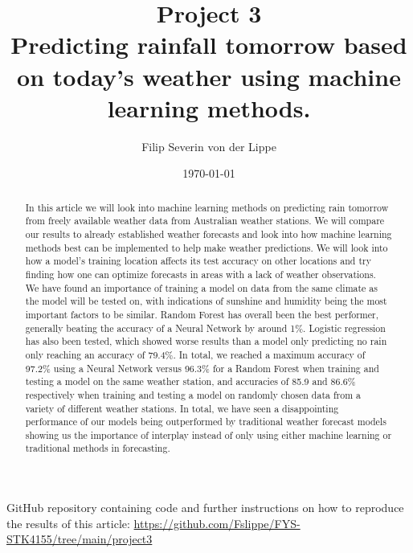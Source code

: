 \documentclass[11pt]{article}
\title{Project 3\\
Predicting rainfall tomorrow based on today's weather using machine learning methods.}
\author{Filip Severin von der Lippe}
\date{\today}
\begin{document}
\maketitle
GitHub repository containing code and further instructions on how to reproduce the results of this article: \url{https://github.com/Fslippe/FYS-STK4155/tree/main/project3}

\begin{abstract}
    In this article we will look into machine learning methods on predicting rain tomorrow from freely available weather data from Australian weather stations. We will compare our results to already established weather forecasts and look into how machine learning methods best can be implemented to help make weather predictions. We will look into how a model's training location affects its test accuracy on other locations and try finding how one can optimize forecasts in areas with a lack of weather observations. We have found an importance of training a model on data from the same climate as the model will be tested on, with indications of sunshine and humidity being the most important factors to be similar. Random Forest has overall been the best performer, generally beating the accuracy of a Neural Network by around 1\%. Logistic regression has also been tested, which showed worse results than a model only predicting no rain only reaching an accuracy of 79.4\%. In total, we reached a maximum accuracy of 97.2\% using a Neural Network versus 96.3\% for a Random Forest when training and testing a model on the same weather station, and accuracies of 85.9 and 86.6\% respectively when training and testing a model on randomly chosen data from a variety of different weather stations. In total, we have seen a disappointing performance of our models being outperformed by traditional weather forecast models showing us the importance of interplay instead of only using either machine learning or traditional methods in forecasting.
\end{abstract}
\newpage
\tableofcontents
\newpage
\end{document}
